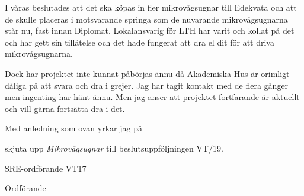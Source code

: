 \documentclass[../_main/handlingar.tex]{subfiles}
\begin{document}

I våras beslutades att det ska köpas in fler mikrovågsugnar till Edekvata och att de skulle placeras i motsvarande springa som de nuvarande mikrovågsugnarna står nu, fast innan Diplomat. Lokalansvarig för LTH har varit och kollat på det och har gett sin tillåtelse och det hade fungerat att dra el dit för att driva mikrovågsugnarna.

Dock har projektet inte kunnat påbörjas ännu då Akademiska Hus är orimligt dåliga på att svara och dra i grejer. Jag har tagit kontakt med de flera gånger men ingenting har hänt ännu. Men jag anser att projektet fortfarande är aktuellt och vill gärna fortsätta dra i det.

Med anledning som ovan yrkar jag på 
\begin{attsatser}
    \att skjuta upp \emph{Mikrovågsugnar} till beslutsuppföljningen VT/19.
\end{attsatser}

\begin{signatures}{2}
    \ist
	\signature{Pontus Landgren}{SRE-ordförande VT17}
    \signature{\ordf}{Ordförande}
\end{signatures}
\end{document}
